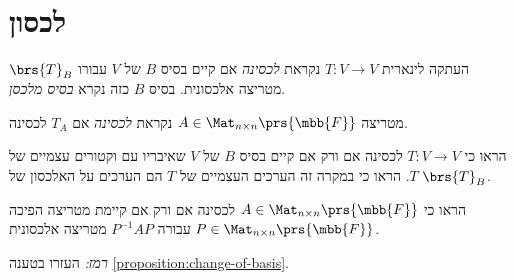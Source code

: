 \documentclass[a4paper,10pt,twoside,openany]{article}
\begin{document}
\section{לכסון}

\begin{definition}[לכסינות]
העתקה לינארית
$T \colon V \to V$
נקראת
\emph{לכסינה}
אם קיים בסיס
$B$
של
$V$
עבורו
$\brs{T}_B$
מטריצה אלכסונית.
בסיס
$B$
כזה נקרא
\emph{בסיס מלכסן}.

מטריצה
$A \in \Mat_{n \times n}\prs{\mbb{F}}$
נקראת
\emph{לכסינה}
אם
$T_A$
לכסינה.
\end{definition}

\begin{exercise}
הראו כי
$T \colon V \to V$
לכסינה אם ורק אם קיים בסיס
$B$
של
$V$
שאיבריו עם וקטורים עצמיים של
$T$.
הראו כי במקרה זה הערכים העצמיים של
$T$
הם הערכים על האלכסון של
$\brs{T}_B$.
\end{exercise}

\begin{exercise}
הראו כי
$A \in \Mat_{n \times n}\prs{\mbb{F}}$
לכסינה אם ורק אם קיימת מטריצה הפיכה
$P \in \Mat_{n \times n}\prs{\mbb{F}}$
עבורה
$P^{-1} A P$
מטריצה אלכסונית.

\emph{רמז:}
העזרו בטענה
\ref{proposition:change-of-basis}.
\end{exercise}
\end{document}
